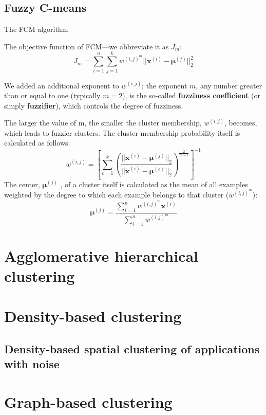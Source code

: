 \subsection{Fuzzy C-means}
\begin{algorithm}
    \caption{The FCM algorithm\label{fcm}}
\end{algorithm}

The objective function of FCM—we abbreviate it as $J_m$:
\begin{equation}
    J_m=\sum_{i=1}^{n}\sum_{j=1}^{k}w^{(i,j)^m}||\bm{x}^{(i)}-\bm{\mu}^{(j)}||_2^2
\end{equation}

We added an additional exponent to $w^{(i,j)}$; the exponent $m$, any number greater than or equal to one (typically $m = 2$), is the so-called \textbf{fuzziness coefficient} (or simply \textbf{fuzzifier}), which controls the degree of fuzziness.

The larger the value of m, the smaller the cluster membership, $w^{(i,j)}$, becomes, which leads to fuzzier clusters. The cluster membership probability itself is calculated as follows:
\begin{equation}
    w^{(i,j)}=\left[\sum_{c=1}^{k}\left(\frac{||\bm{x}^{(i)}-\bm{\mu}^{(j)}||_2}{||\bm{x}^{(i)}-\bm{\mu}^{(c)}||_2}\right)^{\frac{2}{m-1}}\right]^{-1}
\end{equation}
The center, $\bm{\mu}^{(j)}$ , of a cluster itself is calculated as the mean of all examples weighted by the degree to
which each example belongs to that cluster ($w^{(i,j)^m}$):
\begin{equation}
    \bm{\mu}^{(j)}=\frac{\sum_{i=1}^{n}w^{(i,j)^m}\bm{x}^{(i)}}{\sum_{i=1}^{n}w^{(i,j)^m}}
\end{equation}

\section{Agglomerative hierarchical clustering}
\section{Density-based clustering}
\subsection{Density-based spatial clustering of applications with noise}
\section{Graph-based clustering}